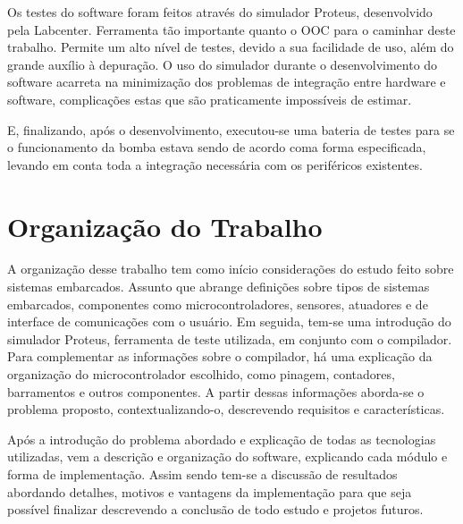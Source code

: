 Os testes do software foram feitos através do simulador Proteus, desenvolvido pela Labcenter. Ferramenta tão importante quanto o OOC para o caminhar deste trabalho. Permite um alto nível de testes, devido a sua facilidade de uso, além do grande auxílio à depuração. O uso do simulador durante o desenvolvimento do software acarreta na minimização dos problemas de integração entre hardware e software, complicações estas que são praticamente impossíveis de estimar. 

E, finalizando, após o desenvolvimento, executou-se uma bateria de testes para se o funcionamento da bomba estava sendo de acordo coma forma especificada, levando em conta toda a integração necessária com os periféricos existentes.

\section{Organização do Trabalho}
A organização desse trabalho tem como início considerações do estudo feito sobre sistemas embarcados. Assunto que abrange definições sobre tipos de sistemas embarcados, componentes como microcontroladores, sensores, atuadores e de interface de comunicações com o usuário. Em seguida, tem-se uma introdução do simulador Proteus, ferramenta de teste utilizada, em conjunto com o compilador. Para complementar as informações sobre o compilador, há uma explicação da organização do microcontrolador escolhido, como pinagem, contadores, barramentos e outros componentes. A partir dessas informações aborda-se o problema proposto, contextualizando-o, descrevendo requisitos e características. 

Após a introdução do problema abordado e explicação de todas as tecnologias utilizadas, vem a descrição e organização do software, explicando cada módulo e forma de implementação. Assim sendo tem-se a discussão de resultados abordando detalhes, motivos e vantagens da implementação para que seja possível finalizar descrevendo a conclusão de todo estudo e projetos futuros.